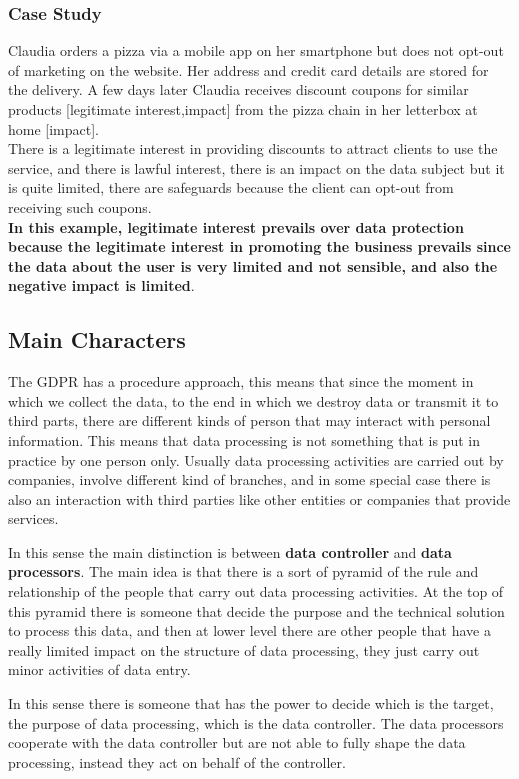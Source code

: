 \subsubsection{Case Study}
Claudia orders a pizza via a mobile app on her smartphone but does not opt-out of marketing on the website. Her address and credit card details are stored for the delivery. A few days later Claudia receives discount coupons for similar products [legitimate interest,impact] from the pizza chain in her letterbox at home [impact].\\
There is a legitimate interest in providing discounts to attract clients to use the service, and there is lawful interest, there is an impact on the data subject but it is quite limited, there are safeguards because the client can opt-out from receiving such coupons.\\
\textbf{In this example, legitimate interest prevails over data protection because the legitimate interest in promoting the business prevails since the data about the user is very limited and not sensible, and also the negative impact is limited}.

\subsection{Main Characters}
The GDPR has a procedure approach, this means that since the moment in which we collect the data, to the end in which we destroy data or transmit it to third parts, there are different kinds of person that may interact with personal information. This means that data processing is not something that is put in practice by one person only. Usually data processing activities are carried out by companies, involve different kind of branches, and in some special case there is also an interaction with third parties like other entities or companies that provide services.

In this sense the main distinction is between \textbf{data controller} and \textbf{data processors}. The main idea is that there is a sort of pyramid of the rule and relationship of the people that carry out data processing activities. At the top of this pyramid there is someone that decide the purpose and the technical solution to process this data, and then at lower level there are other people that have a really limited impact on the structure of data processing, they just carry out minor activities of data entry.

In this sense there is someone that has the power to decide which is the target, the purpose of data processing, which is the data controller. The data processors cooperate with the data controller but are not able to fully shape the data processing, instead they act on behalf of the controller.
